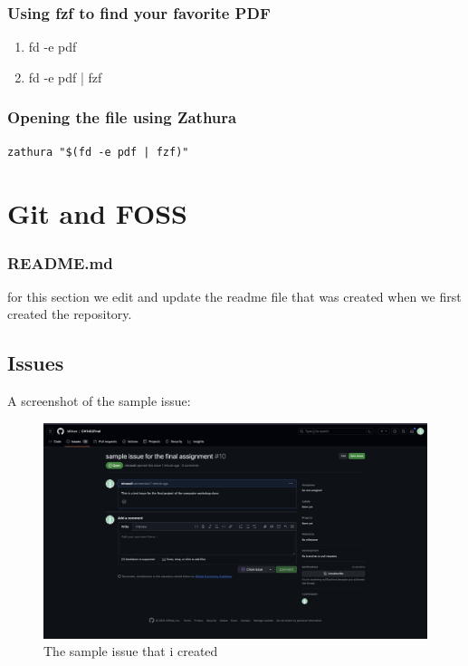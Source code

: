 \documentclass[titlepage]{article}
\begin{document}
\subsubsection{Using fzf to find your favorite PDF}
\begin{enumerate}
\item fd -e pdf

\item fd -e pdf | fzf
\end{enumerate}

\subsubsection{Opening the file using Zathura}
\begin{verbatim}
zathura "$(fd -e pdf | fzf)"
\end{verbatim}

\section{Git and FOSS}
\subsubsection{README.md}
for this section we edit and update the readme file that was created when we first created the repository.

\subsection{Issues}
A screenshot of the sample issue:
\begin{figure}[h]
\centering
\includegraphics[width=1\textwidth]{sample-issue.png} 
\caption{The sample issue that i created}
\end{figure}
\end{document}
